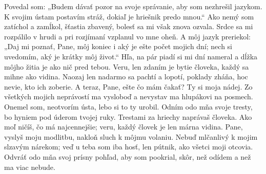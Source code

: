 Povedal som: „Budem dávať pozor na svoje správanie,
aby som nezhrešil jazykom.
\versseparator
K svojim ústam postavím stráž,
dokiaľ je hriešnik predo mnou.“
\versseparator
Ako nemý som zatíchol a zamĺkol, šťastia zbavený,
bolesť sa mi však znova ozvala.
\versseparator
Srdce sa mi rozpálilo v hrudi
a pri rozjímaní vzplanul vo mne oheň.
\versseparator
A môj jazyk preriekol:
„Daj mi poznať, Pane, môj koniec
\versseparator
i aký je ešte počet mojich dní;
nech si uvedomím, aký je krátky môj život.“
\versseparator
Hľa, na pár piadí si mi dní nameral
a dĺžka môjho žitia je ako nič pred tebou.
\versseparator
Veru, len zdaním je bytie človeka,
každý sa mihne ako vidina.
\versseparator
Naozaj len nadarmo sa pachtí a lopotí,
poklady zháňa, hoc nevie, kto ich zoberie.
\versseparator
A teraz, Pane, ešte čo mám čakať?
Ty si moja nádej.
\versseparator
Zo všetkých mojich neprávostí ma vysloboď
a nevystav ma hlupákovi na posmech.
\versseparator
Onemel som, neotvorím ústa,
lebo si to ty urobil.
Odním odo mňa svoje tresty,
\versseparator
bo hyniem pod úderom tvojej ruky.
Trestami za hriechy naprávaš človeka.
\versseparator
Ako moľ ničíš, čo má najcennejšie;
veru, každý človek je len márna vidina.
\versseparator
Pane, vyslyš moju modlitbu,
nakloň sluch k môjmu volaniu.
\versseparator
Nebuď mlčanlivý k mojim slzavým nárekom;
veď u teba som iba hosť,
len pútnik, ako všetci moji otcovia.
\versseparator
Odvráť odo mňa svoj prísny pohľad, aby som pookrial,
skôr, než odídem a než ma viac nebude.